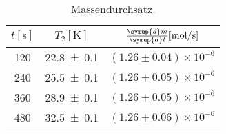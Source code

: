 \begin{table}
  \centering
  \caption{Massendurchsatz.}
  \label{tab:tabelle4}
  \begin{tabular}{c c c}
    \toprule
    {$t [\si{\second}]$} & {$T_2 [\si{\kelvin}]$} & {$\frac{\symup{d} m}{\symup{d} t} [\si{\mol\per\second}]$} \\
    \midrule
    \num{120}            & \num{22.8 +- 0.1}      & $(1.26 \pm 0.04) \times 10^{-6}$                           \\
    \num{240}            & \num{25.5 +- 0.1}      & $(1.26 \pm 0.05) \times 10^{-6}$                           \\
    \num{360}            & \num{28.9 +- 0.1}      & $(1.26 \pm 0.05) \times 10^{-6}$                           \\
    \num{480}            & \num{32.5 +- 0.1}      & $(1.26 \pm 0.06) \times 10^{-6}$                           \\
    \bottomrule
  \end{tabular}
\end{table}


